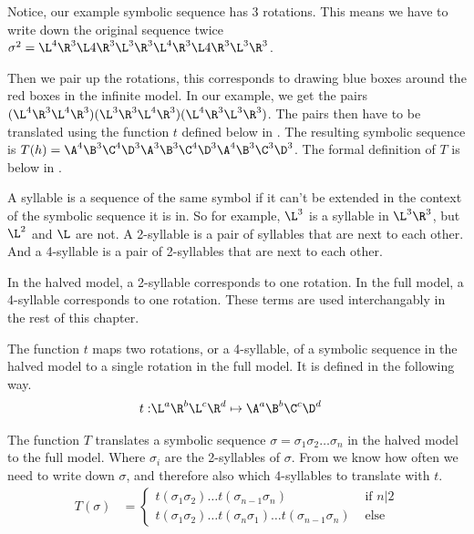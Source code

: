 Notice, our example symbolic sequence has 3 rotations.
This means we have to write down the original sequence twice $\sigma^2 = \L^4\R^3\L4\R^3\L^3\R^3\L^4\R^3\L4\R^3\L^3\R^3$.

Then we pair up the rotations, this corresponds to drawing blue boxes around the red boxes in the infinite model.
In our example, we get the pairs $(\L^4\R^3\L^4\R^3)(\L^3\R^3\L^4\R^3)(\L^4\R^3\L^3\R^3)$.
The pairs then have to be translated using the function $t$ defined below in .
The resulting symbolic sequence is $T(h) = \A^4\B^3\C^4\D^3\A^3\B^3\C^4\D^3\A^4\B^3\C^3\D^3$.
The formal definition of $T$ is below in .

\begin{definition}[Syllables]
	A syllable is a sequence of the same symbol if it can't be extended in the context of the symbolic sequence it is in.
	So for example, $\L^3$ is a syllable in $\L^3\R^3$, but $\L^2$ and $\L$ are not.
	A 2-syllable is a pair of syllables that are next to each other.
	And a 4-syllable is a pair of 2-syllables that are next to each other.

	In the halved model, a 2-syllable corresponds to one rotation.
	In the full model, a 4-syllable corresponds to one rotation.
	These terms are used interchangably in the rest of this chapter.
\end{definition}

\begin{definition}
	\label{def:t}
	The function $t$ maps two rotations, or a 4-syllable, of a symbolic sequence in the halved model to a single rotation in the full model.
	It is defined in the following way.
	\begin{align}
		t: & \L^a\R^b\L^c\R^d \mapsto \A^a\B^b\C^c\D^d
	\end{align}
\end{definition}

\begin{definition}
	\label{def:T}
	The function $T$ translates a symbolic sequence $\sigma = \sigma_1\sigma_2 \dots \sigma_n$ in the halved model to the full model.
	Where $\sigma_i$ are the 2-syllables of $\sigma$.
	From  we know how often we need to write down $\sigma$, and therefore also which 4-syllables to translate with $t$.
	\begin{align}
		T(\sigma) & = \begin{cases}
			              t(\sigma_1\sigma_2) \dots t(\sigma_{n-1}\sigma_n)                           & \text{ if } n | 2 \\
			              t(\sigma_1\sigma_2) \dots t(\sigma_n\sigma_1) \dots t(\sigma_{n-1}\sigma_n) & \text{ else }
		              \end{cases}
	\end{align}
\end{definition}

